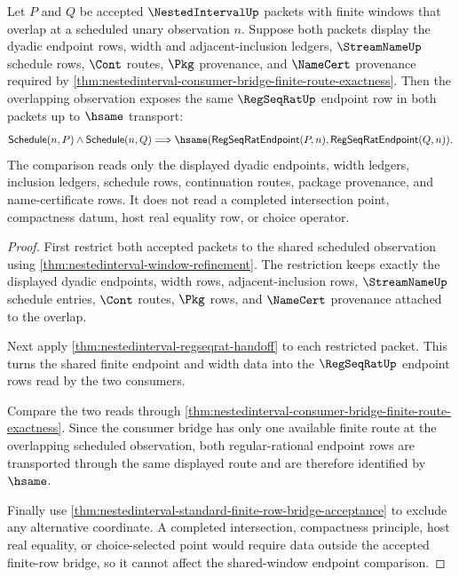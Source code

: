 \begin{theorem}
\label{thm:nestedinterval-shared-window-regseqrat-endpoint-cofinality}
Let $P$ and $Q$ be accepted $\NestedIntervalUp$ packets with finite windows
that overlap at a scheduled unary observation $n$. Suppose both packets display
the dyadic endpoint rows, width and adjacent-inclusion ledgers,
$\StreamNameUp$ schedule rows, $\Cont$ routes, $\Pkg$ provenance, and
$\NameCert$ provenance required by
\autoref{thm:nestedinterval-consumer-bridge-finite-route-exactness}. Then the
overlapping observation exposes the same $\RegSeqRatUp$ endpoint row in both
packets up to $\hsame$ transport:
$$
\mathsf{Schedule}(n,P)\land\mathsf{Schedule}(n,Q)
\Longrightarrow
\hsame(\mathsf{RegSeqRatEndpoint}(P,n),\mathsf{RegSeqRatEndpoint}(Q,n)).
$$
The comparison reads only the displayed dyadic endpoints, width ledgers,
inclusion ledgers, schedule rows, continuation routes, package provenance, and
name-certificate rows. It does not read a completed intersection point,
compactness datum, host real equality row, or choice operator.
\end{theorem}
\begin{proof}
First restrict both accepted packets to the shared scheduled observation using
\autoref{thm:nestedinterval-window-refinement}. The restriction keeps exactly
the displayed dyadic endpoints, width rows, adjacent-inclusion rows,
$\StreamNameUp$ schedule entries, $\Cont$ routes, $\Pkg$ rows, and
$\NameCert$ provenance attached to the overlap.

Next apply \autoref{thm:nestedinterval-regseqrat-handoff} to each restricted
packet. This turns the shared finite endpoint and width data into the
$\RegSeqRatUp$ endpoint rows read by the two consumers.

Compare the two reads through
\autoref{thm:nestedinterval-consumer-bridge-finite-route-exactness}. Since the
consumer bridge has only one available finite route at the overlapping
scheduled observation, both regular-rational endpoint rows are transported
through the same displayed route and are therefore identified by $\hsame$.

Finally use \autoref{thm:nestedinterval-standard-finite-row-bridge-acceptance}
to exclude any alternative coordinate. A completed intersection, compactness
principle, host real equality, or choice-selected point would require data
outside the accepted finite-row bridge, so it cannot affect the shared-window
endpoint comparison.
\end{proof}

